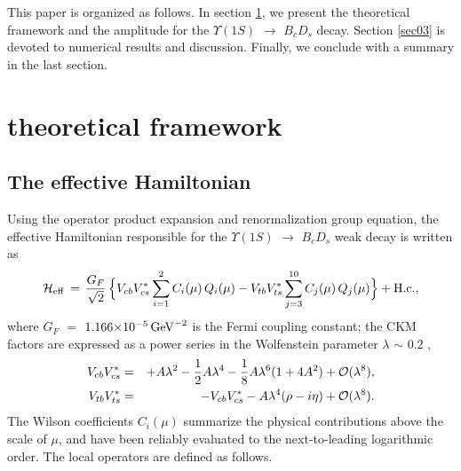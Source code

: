 \documentclass[preprint,superscriptaddress,nofootinbib]{revtex4}
\begin{document}
  This paper is organized as follows.
  In section \ref{sec02}, we present the theoretical framework
  and the amplitude for the ${\Upsilon}(1S)$ ${\to}$ $B_{c}D_{s}$
  decay. Section \ref{sec03} is devoted to numerical results
  and discussion. Finally, we conclude with a summary in
  the last section.

  \section{theoretical framework}
  \label{sec02}
  \subsection{The effective Hamiltonian}
  \label{sec0201}
  Using the operator product expansion and renormalization
  group equation, the effective Hamiltonian responsible for
  the ${\Upsilon}(1S)$ ${\to}$ $B_{c}D_{s}$ weak decay
  is written as \cite{9512380}
   \begin{equation}
  {\cal H}_{\rm eff}\, =\,
   \frac{G_{F}}{\sqrt{2}}\,
   \Big\{ V_{cb} V_{cs}^{\ast}
   \sum\limits_{i=1}^{2}
   C_{i}({\mu})\,Q_{i}({\mu})
  -V_{tb} V_{ts}^{\ast}
   \sum\limits_{j=3}^{10}
   C_{j}({\mu})\,Q_{j}({\mu}) \Big\}
   + {\rm H.c.}
   \label{hamilton},
   \end{equation}
  where $G_{F}$ $=$ $1.166{\times}10^{-5}\,{\rm GeV}^{-2}$ \cite{pdg}
  is the Fermi coupling constant;
  the CKM factors are expressed as a power series in
  the Wolfenstein parameter ${\lambda}$ ${\sim}$ $0.2$ \cite{pdg},
  \begin{eqnarray}
  V_{cb}V_{cs}^{\ast} &=&
  +            A{\lambda}^{2}
  - \frac{1}{2}A{\lambda}^{4}
  - \frac{1}{8}A{\lambda}^{6}(1+4A^{2})
  +{\cal O}({\lambda}^{8})
  \label{eq:ckm01}, \\
  V_{tb}V_{ts}^{\ast} &=& -V_{cb}V_{cs}^{\ast}
  - A{\lambda}^{4}({\rho}-i{\eta})
  +{\cal O}({\lambda}^{8})
  \label{eq:ckm02}.
  \end{eqnarray}
  The Wilson coefficients $C_{i}(\mu)$ summarize the
  physical contributions above the scale of ${\mu}$,
  and have been reliably evaluated to the next-to-leading
  logarithmic order.
  The local operators are defined as follows.
\end{document}
